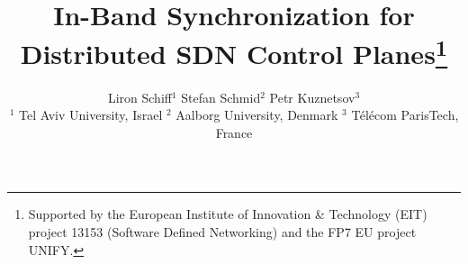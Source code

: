 \documentclass{sig-alternate-2006}
\begin{document}
\sloppy





\title{In-Band Synchronization for\\Distributed SDN Control Planes\thanks{Supported by the
European Institute of Innovation \& Technology (EIT) project 13153 (Software Defined Networking) 
and the FP7 EU project UNIFY.}}




\author{
Liron Schiff$^1$  \quad %
Stefan Schmid$^2$ \quad Petr Kuznetsov$^3$ \\
\small $^1$ Tel Aviv University, Israel \quad $^2$ Aalborg University,
Denmark \quad $^3$ T\'el\'ecom ParisTech, France
}


\date{}


\maketitle


\thispagestyle{empty}
\end{document}

